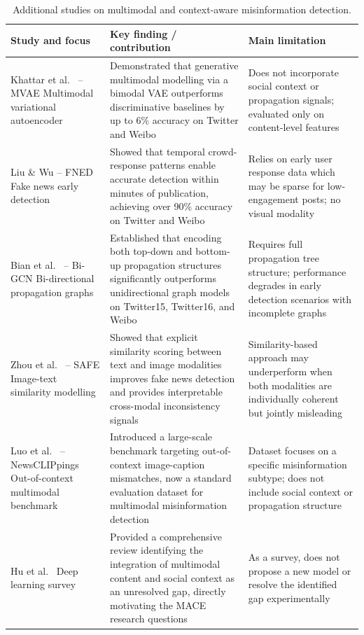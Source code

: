 \begin{table}[ht]
\centering
\caption{Additional studies on multimodal and context-aware misinformation detection.}
\label{tab:athul_lit_review}
\renewcommand{\arraystretch}{1.3}
\begin{tabular}{|p{3.5cm}|p{5.0cm}|p{4.5cm}|}
\hline
\textbf{Study and focus} & \textbf{Key finding / contribution} & \textbf{Main limitation} \\
\hline
Khattar et al.\ \cite{Khattar2019} -- MVAE \newline Multimodal variational autoencoder &
Demonstrated that generative multimodal modelling via a bimodal VAE outperforms discriminative baselines by up to 6\% accuracy on Twitter and Weibo &
Does not incorporate social context or propagation signals; evaluated only on content-level features \\
\hline
Liu \& Wu \cite{Liu2020} -- FNED \newline Fake news early detection &
Showed that temporal crowd-response patterns enable accurate detection within minutes of publication, achieving over 90\% accuracy on Twitter and Weibo &
Relies on early user response data which may be sparse for low-engagement posts; no visual modality \\
\hline
Bian et al.\ \cite{Bian2020} -- Bi-GCN \newline Bi-directional propagation graphs &
Established that encoding both top-down and bottom-up propagation structures significantly outperforms unidirectional graph models on Twitter15, Twitter16, and Weibo &
Requires full propagation tree structure; performance degrades in early detection scenarios with incomplete graphs \\
\hline
Zhou et al.\ \cite{Zhou2020} -- SAFE \newline Image-text similarity modelling &
Showed that explicit similarity scoring between text and image modalities improves fake news detection and provides interpretable cross-modal inconsistency signals &
Similarity-based approach may underperform when both modalities are individually coherent but jointly misleading \\
\hline
Luo et al.\ \cite{Luo2021} -- NewsCLIPpings \newline Out-of-context multimodal benchmark &
Introduced a large-scale benchmark targeting out-of-context image-caption mismatches, now a standard evaluation dataset for multimodal misinformation detection &
Dataset focuses on a specific misinformation subtype; does not include social context or propagation structure \\
\hline
Hu et al.\ \cite{Hu2022} \newline Deep learning survey &
Provided a comprehensive review identifying the integration of multimodal content and social context as an unresolved gap, directly motivating the MACE research questions &
As a survey, does not propose a new model or resolve the identified gap experimentally \\
\hline
\end{tabular}
\end{table}

